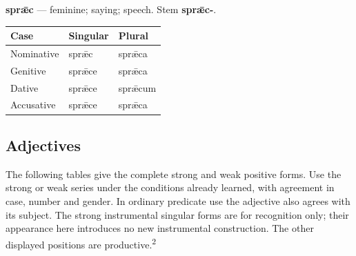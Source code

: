 \par\begin{minipage}{\linewidth}\raggedright
\textbf{sprǣc} — feminine; saying; speech. Stem \textbf{sprǣc-}.

\par\begingroup
\fontsize{10.5}{13.2}\selectfont
\setlength{\LTleft}{0pt}\setlength{\LTright}{\fill}
\noindent
\begin{tabular}{@{}>{\raggedright\arraybackslash}p{39.46mm}>{\raggedright\arraybackslash}p{39.46mm}>{\raggedright\arraybackslash}p{39.46mm}@{}}
\toprule
\textbf{Case} & \textbf{Singular} & \textbf{Plural} \\
\midrule
Nominative & sprǣc & sprǣca \\
Genitive & sprǣce & sprǣca \\
Dative & sprǣce & sprǣcum \\
Accusative & sprǣce & sprǣca \\
\bottomrule
\end{tabular}
\par\endgroup

\end{minipage}\par
{}
\subsection*{Adjectives}

The following tables give the complete strong and weak positive forms. Use the strong or weak series under the conditions already learned, with agreement in case, number and gender. In ordinary predicate use the adjective also agrees with its subject. The strong instrumental singular forms are for recognition only; their appearance here introduces no new instrumental construction. The other displayed positions are productive.\textsuperscript{2}

